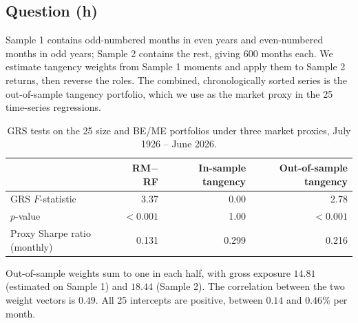 \subsection{Question (h)}

Sample 1 contains odd-numbered months in even years and even-numbered months
in odd years; Sample 2 contains the rest, giving 600 months each. We estimate
tangency weights from Sample 1 moments and apply them to Sample 2 returns,
then reverse the roles. The combined, chronologically sorted series is the
out-of-sample tangency portfolio, which we use as the market proxy in the 25
time-series regressions.

\begin{table}[H]
\centering
\caption{GRS tests on the 25 size and BE/ME portfolios under three market
proxies, July 1926 -- June 2026.}
\small
\begin{tabular}{lrrr}
\toprule
& RM$-$RF & In-sample tangency & Out-of-sample tangency \\
\midrule
GRS $F$-statistic & 3.37 & 0.00 & 2.78 \\
$p$-value & $<0.001$ & 1.00 & $<0.001$ \\
Proxy Sharpe ratio (monthly) & 0.131 & 0.299 & 0.216 \\
\bottomrule
\end{tabular}
\label{tab:p3h}
\vspace{2pt}\begin{minipage}{0.93\textwidth}\footnotesize
Out-of-sample weights sum to one in each half, with gross exposure $14.81$
(estimated on Sample 1) and $18.44$ (Sample 2). The correlation between the
two weight vectors is $0.49$. All 25 intercepts are positive, between $0.14$
and $0.46\%$ per month.
\end{minipage}
\end{table}

